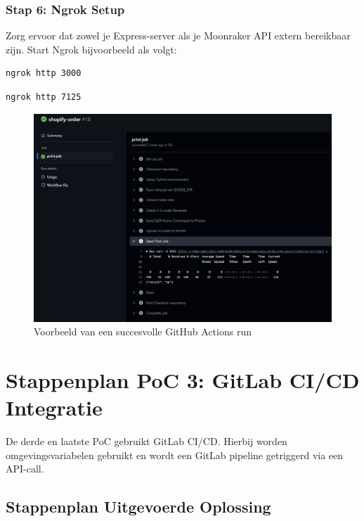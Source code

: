 \begin{enumerate}
\subsubsection{Stap 6: Ngrok Setup}

Zorg ervoor dat zowel je Express-server als je Moonraker API extern bereikbaar zijn. Start Ngrok bijvoorbeeld als volgt:

\begin{lstlisting}[language=bash, caption=Ngrok tunnel starten voor Express]
ngrok http 3000
\end{lstlisting}

\begin{lstlisting}[language=bash, caption=Ngrok tunnel starten voor Moonraker]
ngrok http 7125
\end{lstlisting}

\begin{figure}[H]
    \centering
    \includegraphics[width=1\linewidth]{foto's/Github/GithubPrintSucces.png}
    \caption{Voorbeeld van een succesvolle GitHub Actions run}
    \label{fig:Github_Succes}
\end{figure}

\section{Stappenplan PoC 3: GitLab CI/CD Integratie}

De derde en laatste PoC gebruikt GitLab CI/CD. Hierbij worden omgevingsvariabelen gebruikt en wordt een GitLab pipeline getriggerd via een API-call.

\subsection{Stappenplan Uitgevoerde Oplossing}


\end{enumerate}
